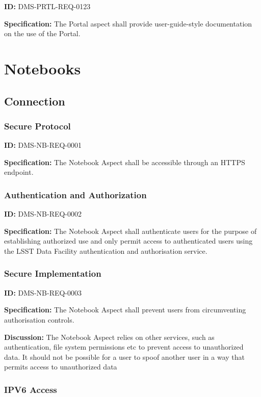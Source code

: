 \documentclass[SE,toc,lsstdraft]{lsstdoc}
\begin{document}
\label{DMS-PRTL-REQ-0123}
\textbf{ID:} DMS-PRTL-REQ-0123

\textbf{Specification:}
The Portal aspect shall provide user-guide-style documentation on the use of the Portal.

\section{Notebooks}

\subsection{Connection}

\subsubsection{Secure Protocol}

\label{DMS-NB-REQ-0001}
\textbf{ID:} DMS-NB-REQ-0001

\textbf{Specification:}
The Notebook Aspect shall be accessible through an HTTPS endpoint.

\subsubsection{Authentication and Authorization}

\label{DMS-NB-REQ-0002}
\textbf{ID:} DMS-NB-REQ-0002

\textbf{Specification:}
The Notebook Aspect shall authenticate users for the purpose of establishing authorized use and only permit access to authenticated users using the LSST Data Facility authentication and authorisation service.

\subsubsection{Secure Implementation}

\label{DMS-NB-REQ-0003}
\textbf{ID:} DMS-NB-REQ-0003

\textbf{Specification:}
The Notebook Aspect shall prevent users from circumventing authorisation controls.

\textbf{Discussion:}
The Notebook Aspect relies on other services, such as authentication, file system permissions etc to prevent access to unauthorized data. It should not be possible for a user to spoof another user in a way that permits access to unauthorized data

\subsubsection{IPV6 Access}
\end{document}
